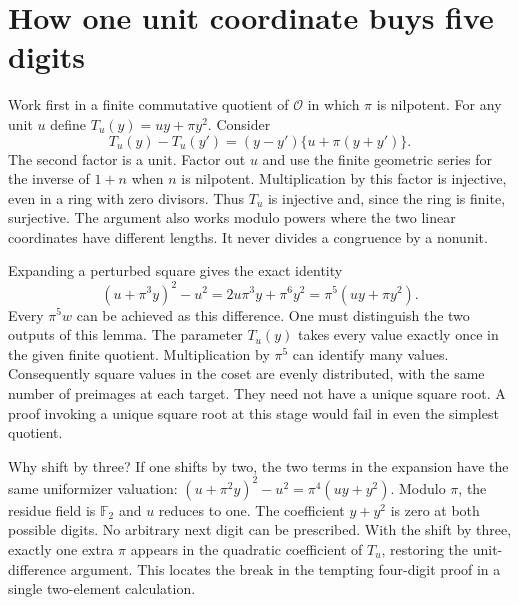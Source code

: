 \documentclass[12pt,letterpaper]{article}
\begin{document}
\section{How one unit coordinate buys five digits}
Work first in a finite commutative quotient of $\mathcal O$ in which $\pi$ is nilpotent. For any unit $u$ define $T_u(y)=uy+\pi y^2$. Consider
\[
 T_u(y)-T_u(y')=(y-y')\{u+\pi(y+y')\}.
\]
The second factor is a unit. Factor out $u$ and use the finite geometric series for the inverse of $1+n$ when $n$ is nilpotent. Multiplication by this factor is injective, even in a ring with zero divisors. Thus $T_u$ is injective and, since the ring is finite, surjective. The argument also works modulo powers where the two linear coordinates have different lengths. It never divides a congruence by a nonunit.
\par
Expanding a perturbed square gives the exact identity
\[
   (u+\pi^3 y)^2-u^2=2u\pi^3y+\pi^6y^2
                    =\pi^5(uy+\pi y^2).
\]
Every $\pi^5w$ can be achieved as this difference. One must distinguish the two outputs of this lemma. The parameter $T_u(y)$ takes every value exactly once in the given finite quotient. Multiplication by $\pi^5$ can identify many values. Consequently square values in the coset are evenly distributed, with the same number of preimages at each target. They need not have a unique square root. A proof invoking a unique square root at this stage would fail in even the simplest quotient.
\par
Why shift by three? If one shifts by two, the two terms in the expansion have the same uniformizer valuation: $(u+\pi^2y)^2-u^2=\pi^4(uy+y^2)$. Modulo $\pi$, the residue field is $\mathbb F_2$ and $u$ reduces to one. The coefficient $y+y^2$ is zero at both possible digits. No arbitrary next digit can be prescribed. With the shift by three, exactly one extra $\pi$ appears in the quadratic coefficient of $T_u$, restoring the unit-difference argument. This locates the break in the tempting four-digit proof in a single two-element calculation.
\end{document}
